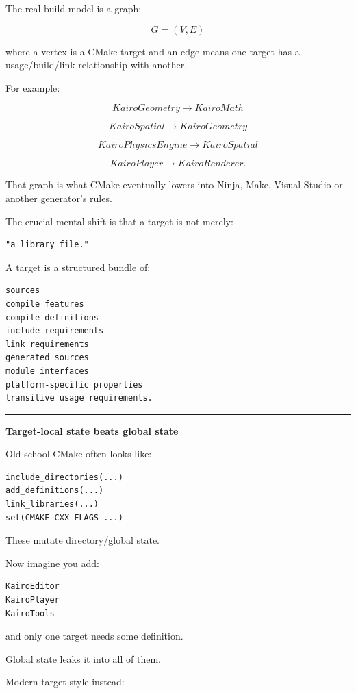 The real build model is a graph:

\[
G=(V,E)
\]

where a vertex is a CMake target and an edge means one target has a usage/build/link relationship with another.

For example:

\[
KairoGeometry\rightarrow KairoMath
\]

\[
KairoSpatial\rightarrow KairoGeometry
\]

\[
KairoPhysicsEngine\rightarrow KairoSpatial
\]

\[
KairoPlayer\rightarrow KairoRenderer.
\]

That graph is what CMake eventually lowers into Ninja, Make, Visual Studio or another generator's rules.

The crucial mental shift is that a target is not merely:

\begin{verbatim}
"a library file."
\end{verbatim}

A target is a structured bundle of:

\begin{verbatim}
sources
compile features
compile definitions
include requirements
link requirements
generated sources
module interfaces
platform-specific properties
transitive usage requirements.
\end{verbatim}

\begin{center}\rule{0.5\linewidth}{0.5pt}\end{center}

\textbf{Target-local state beats global state}

Old-school CMake often looks like:

\begin{verbatim}
include_directories(...)
add_definitions(...)
link_libraries(...)
set(CMAKE_CXX_FLAGS ...)
\end{verbatim}

These mutate directory/global state.

Now imagine you add:

\begin{verbatim}
KairoEditor
KairoPlayer
KairoTools
\end{verbatim}

and only one target needs some definition.

Global state leaks it into all of them.

Modern target style instead:

